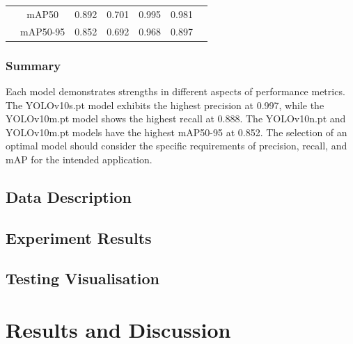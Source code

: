 \documentclass[12pt,oneside]{book} %
\begin{document}
\begin{table}[h!]
\begin{adjustbox}{max width=\textwidth}
\begin{tabular}{lcccccc}
                                                  & mAP50           & 0.892        & 0.701                       & 0.995                          & 0.981                     \\
                                                  & mAP50-95        & 0.852        & 0.692                       & 0.968                          & 0.897                     \\
            \bottomrule
        \end{tabular}
    \end{adjustbox}
    \label{tab:comparison}
\end{table}

\subsection{Summary}

Each model demonstrates strengths in different aspects of performance metrics.
The YOLOv10s.pt model exhibits the highest precision at 0.997, while the
YOLOv10m.pt model shows the highest recall at 0.888. The YOLOv10n.pt and
YOLOv10m.pt models have the highest mAP50-95 at 0.852. The selection of an
optimal model should consider the specific requirements of precision, recall,
and mAP for the intended application.

\section{Data Description}

\section{Experiment Results}

\section{Testing Visualisation}

\chapter{Results and Discussion}

%



\end{document}

